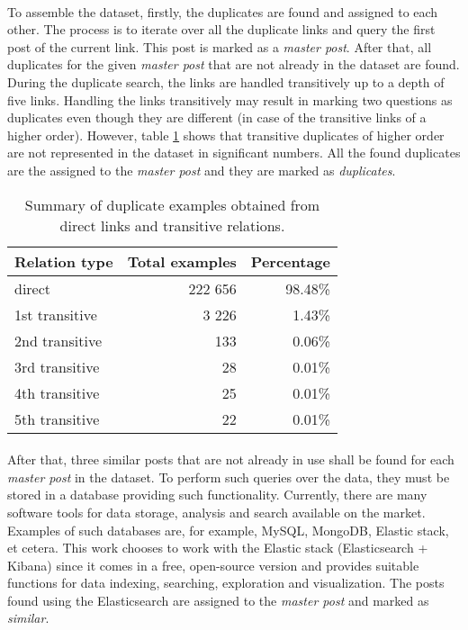 \paragraph{}
To assemble the dataset, firstly, the duplicates are found and assigned to each other. The process is to iterate over all the duplicate links and query the first post of the current link. This post is marked as a \textit{master post}. After that, all duplicates for the given \textit{master post} that are not already in the dataset are found. During the duplicate search, the links are handled transitively up to a depth of five links. Handling the links transitively may result in marking two questions as duplicates even though they are different (in case of the transitive links of a higher order). However, table \ref{transitive_duplicates} shows that transitive duplicates of higher order are not represented in the dataset in significant numbers. All the found duplicates are the assigned to the \textit{master post} and they are marked as \textit{duplicates}.

\begin{table}[h!]
	\begin{center}
		\begin{tabular}{l r r} 
			\hline
			\textbf{Relation type} & \textbf{Total examples} & \textbf{Percentage} \\ [0.5ex] 
			\hline\hline
			direct & 222 656 & 98.48\% \\
			1st transitive  & 3 226 & 1.43\% \\
			2nd transitive & 133 & 0.06\%  \\
			3rd transitive & 28 & 0.01\%  \\
			4th transitive & 25 & 0.01\%  \\
			5th transitive & 22 & 0.01\%  \\
			\hline
		\end{tabular}
	\end{center}
	\caption{Summary of duplicate examples obtained from direct links and transitive relations.}
	\label{transitive_duplicates}
\end{table}

\paragraph{}
After that, three similar posts that are not already in use shall be found for each \textit{master post} in the dataset. To perform such queries over the data, they must be stored in a database providing such functionality. Currently, there are many software tools for data storage, analysis and search available on the market. Examples of such databases are, for example, MySQL, MongoDB, Elastic stack, et cetera. This work chooses to work with the Elastic stack (Elasticsearch + Kibana) since it comes in a free, open-source version and provides suitable functions for data indexing, searching, exploration and visualization. The posts found using the Elasticsearch are assigned to the \textit{master post} and marked as \textit{similar}.


